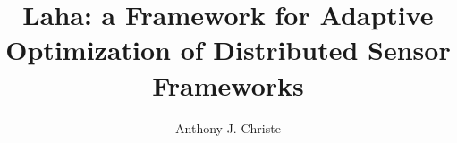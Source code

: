 \documentclass[11pt, dissertation]{uhthesis}
\title{Laha: a Framework for Adaptive Optimization of Distributed Sensor Frameworks}
\author{Anthony J. Christe}
\begin{document}
\maketitle

\begin{frontmatter}


\copyrightpage







\tableofcontents

\listoftables

\listoffigures

\end{frontmatter}








\appendix






%
\end{document}
